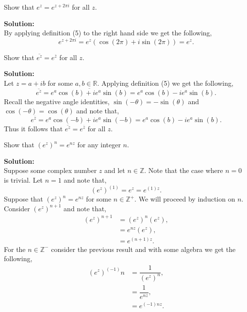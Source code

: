 \documentclass[12pt]{article}
\makeatletter
\theoremstyle{homework}
\newenvironment{exercise}[1]
{\def\@currentlabel{#1}\exercisecore}
{\endexercisecore}
\newcommand{\localhead}[1]{\par\smallskip\noindent\textbf{#1}\nobreak\\}%
\newcommand\solution{\localhead{Solution:}}
\newcommand{\Reals}{\ensuremath{\mathbb R}}
\let\RR\Reals
\makeatother
\begin{document}
\begin{exercise}{7} Show that $e^z = e^{z + 2\pi i}$ for all $z$.\\
    \solution By applying definition (5) to the right hand side we get the following, 
    \begin{equation*}
        e^{z + 2\pi i} = e^{z}(\cos(2\pi) + i \sin(2\pi)) = e^z.
    \end{equation*}
\end{exercise}
\vspace{.15in}


\begin{exercise}{8b} Show that $\overline{e^z} = e^{\overline{z}}$ for all $z$.\\
    \solution Let $z = a + ib$ for some $a, b \in \RR$. Applying definition (5) we get the following, 
    \begin{equation*}
        \overline{e^z} = \overline{e^a\cos(b) + ie^a\sin(b)} =e^a\cos(b) - ie^a\sin(b). 
    \end{equation*}
    Recall the negative angle identities, $\sin(-\theta) = -\sin(\theta)$ and $\cos(-\theta) = \cos(\theta)$ and note that, 
    \begin{equation*}
        e^{\overline{z}} = e^a\cos(-b) + ie^a\sin(-b) =  e^a\cos(b) - ie^a\sin(b).
    \end{equation*}
    Thus it follows that $\overline{e^z} = e^{\overline{z}}$ for all $z$.
\end{exercise}
\vspace{.15in}



\begin{exercise}{9} Show that $(e^z)^n = e^{nz}$ for any integer $n$.\\
    \solution Suppose some complex number $z$ and let $n \in \mathbb{Z}$. Note that the case where $n = 0$ is trivial. Let $n = 1$ and 
    note that, 
    \begin{equation*}
        (e^z)^{(1)} = e^{z} = e^{(1)z}. 
    \end{equation*} 
    Suppose that $(e^z)^n = e^{nz}$ for some $n \in \mathbb{Z}^+$. We will proceed by induction on $n$. Consider $(e^z)^{n+1}$ and note that, 
    \begin{align*}
        (e^z)^{n+1} &= (e^z)^{n} (e^z),\\
         &= e^{nz} (e^z),\\ 
         &= e^{(n+1)z}. 
    \end{align*} 
    For the  $n \in \mathbb{Z}^-$ consider the previous result and with some algebra we get the following, 
    \begin{align*}
        (e^z)^{(-1)}n &= \dfrac{1}{(e^z)^n},\\
        &= \dfrac{1}{e^{nz}},\\
        &= e^{(-1)nz}.
    \end{align*}
\end{exercise}
\vspace{.15in}
\end{document}
